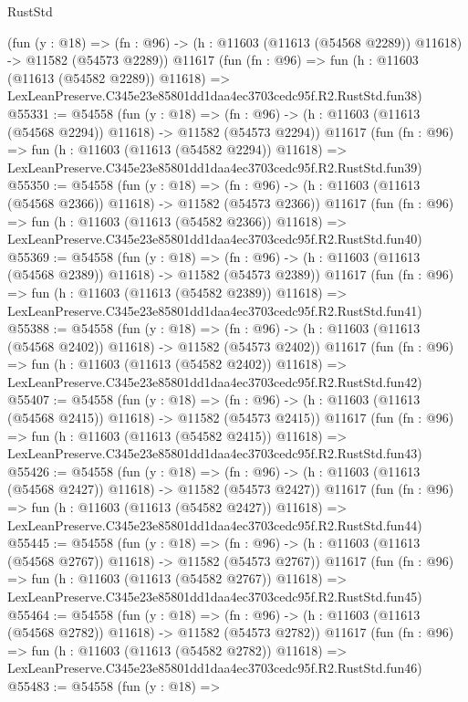 \begin{lexlean}{RustStd}
\begin{coremodule}
    (fun (y : @18) =>
    (fn : @96) -> (h : @11603 (@11613 (@54568 @2289)) @11618) -> @11582 (@54573 @2289))
    @11617
    (fun (fn : @96) =>
    fun (h : @11603 (@11613 (@54582 @2289)) @11618) =>
    LexLeanPreserve.C345e23e85801dd1daa4ec3703cedc95f.R2.RustStd.fun38)
@55331 := @54558
    (fun (y : @18) =>
    (fn : @96) -> (h : @11603 (@11613 (@54568 @2294)) @11618) -> @11582 (@54573 @2294))
    @11617
    (fun (fn : @96) =>
    fun (h : @11603 (@11613 (@54582 @2294)) @11618) =>
    LexLeanPreserve.C345e23e85801dd1daa4ec3703cedc95f.R2.RustStd.fun39)
@55350 := @54558
    (fun (y : @18) =>
    (fn : @96) -> (h : @11603 (@11613 (@54568 @2366)) @11618) -> @11582 (@54573 @2366))
    @11617
    (fun (fn : @96) =>
    fun (h : @11603 (@11613 (@54582 @2366)) @11618) =>
    LexLeanPreserve.C345e23e85801dd1daa4ec3703cedc95f.R2.RustStd.fun40)
@55369 := @54558
    (fun (y : @18) =>
    (fn : @96) -> (h : @11603 (@11613 (@54568 @2389)) @11618) -> @11582 (@54573 @2389))
    @11617
    (fun (fn : @96) =>
    fun (h : @11603 (@11613 (@54582 @2389)) @11618) =>
    LexLeanPreserve.C345e23e85801dd1daa4ec3703cedc95f.R2.RustStd.fun41)
@55388 := @54558
    (fun (y : @18) =>
    (fn : @96) -> (h : @11603 (@11613 (@54568 @2402)) @11618) -> @11582 (@54573 @2402))
    @11617
    (fun (fn : @96) =>
    fun (h : @11603 (@11613 (@54582 @2402)) @11618) =>
    LexLeanPreserve.C345e23e85801dd1daa4ec3703cedc95f.R2.RustStd.fun42)
@55407 := @54558
    (fun (y : @18) =>
    (fn : @96) -> (h : @11603 (@11613 (@54568 @2415)) @11618) -> @11582 (@54573 @2415))
    @11617
    (fun (fn : @96) =>
    fun (h : @11603 (@11613 (@54582 @2415)) @11618) =>
    LexLeanPreserve.C345e23e85801dd1daa4ec3703cedc95f.R2.RustStd.fun43)
@55426 := @54558
    (fun (y : @18) =>
    (fn : @96) -> (h : @11603 (@11613 (@54568 @2427)) @11618) -> @11582 (@54573 @2427))
    @11617
    (fun (fn : @96) =>
    fun (h : @11603 (@11613 (@54582 @2427)) @11618) =>
    LexLeanPreserve.C345e23e85801dd1daa4ec3703cedc95f.R2.RustStd.fun44)
@55445 := @54558
    (fun (y : @18) =>
    (fn : @96) -> (h : @11603 (@11613 (@54568 @2767)) @11618) -> @11582 (@54573 @2767))
    @11617
    (fun (fn : @96) =>
    fun (h : @11603 (@11613 (@54582 @2767)) @11618) =>
    LexLeanPreserve.C345e23e85801dd1daa4ec3703cedc95f.R2.RustStd.fun45)
@55464 := @54558
    (fun (y : @18) =>
    (fn : @96) -> (h : @11603 (@11613 (@54568 @2782)) @11618) -> @11582 (@54573 @2782))
    @11617
    (fun (fn : @96) =>
    fun (h : @11603 (@11613 (@54582 @2782)) @11618) =>
    LexLeanPreserve.C345e23e85801dd1daa4ec3703cedc95f.R2.RustStd.fun46)
@55483 := @54558
    (fun (y : @18) =>

\end{coremodule}
\end{lexlean}
